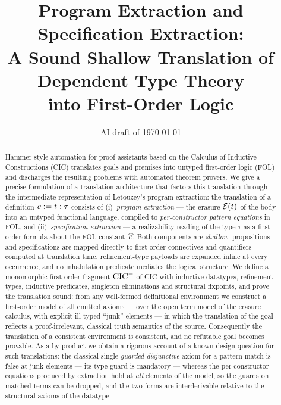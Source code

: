 \documentclass[11pt,a4paper]{article}
\title{Program Extraction and Specification Extraction:\\
  A Sound Shallow Translation of Dependent Type Theory\\
  into First-Order Logic}
\author{}
\date{AI draft of \today}
\begin{document}
\maketitle

\begin{abstract}
  Hammer-style automation for proof assistants based on the Calculus of
  Inductive Constructions (CIC) translates goals and premises into untyped
  first-order logic (FOL) and discharges the resulting problems with
  automated theorem provers.  We give a precise formulation of a translation
  architecture that factors this translation through the intermediate
  representation of Letouzey's program extraction: the translation of a
  definition $c \mathrel{:=} t : \tau$ consists of (i)~\emph{program extraction} ---
  the erasure $\mathcal{E}(t)$ of the body into an untyped functional language,
  compiled to \emph{per-constructor pattern equations} in FOL, and
  (ii)~\emph{specification extraction} --- a realizability reading of the
  type $\tau$ as a first-order formula about the FOL constant~$\widehat{c}$.
  Both components are \emph{shallow}: propositions and specifications are
  mapped directly to first-order connectives and quantifiers computed at
  translation time, refinement-type payloads are expanded inline at every
  occurrence, and no inhabitation predicate mediates the logical structure.
  We define a monomorphic first-order fragment $\mathrm{CIC}^{-}$ of CIC with inductive
  datatypes, refinement types, inductive predicates, singleton eliminations
  and structural fixpoints, and prove the translation sound: from any
  well-formed definitional environment we construct a first-order model of
  all emitted axioms --- over the open term model of the erasure calculus,
  with explicit ill-typed ``junk'' elements --- in which the translation of
  the goal reflects a proof-irrelevant, classical truth semantics of the
  source.  Consequently the translation of a consistent environment is
  consistent, and no refutable goal becomes provable.  As a by-product we
  obtain a rigorous account of a known design question for such translations:
  the classical single \emph{guarded disjunctive} axiom for a pattern match
  is false at junk elements --- its type guard is mandatory --- whereas the
  per-constructor equations produced by extraction hold at \emph{all}
  elements of the model, so the guards on matched terms can be dropped, and
  the two forms are interderivable relative to the structural axioms of the
  datatype.
\end{abstract}

\tableofcontents















\appendix

\end{document}
